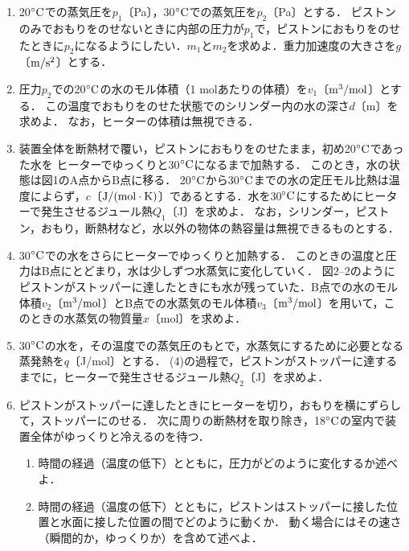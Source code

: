 \begin{enumerate}[(1)]  
  \item 20${}^\circ\mathrm{C}$での蒸気圧を$p_1$〔Pa〕，30${}^\circ\mathrm{C}$での蒸気圧を$p_2$〔Pa〕とする．
  ピストンのみでおもりをのせないときに内部の圧力が$p_1$で，ピストンにおもりをのせたときに$p_2$になるようにしたい．$m_1$と$m_2$を求めよ．重力加速度の大きさを$g$〔$\mathrm{m}/\mathrm{s}^2$〕とする．
\item 圧力$p_2$での20${}^\circ\mathrm{C}$の水のモル体積（1 molあたりの体積）を$v_1$〔$\mathrm{m}^3 / \mathrm{mol}$〕とする．
  この温度でおもりをのせた状態でのシリンダー内の水の深さ$d$〔m〕を求めよ．
  なお，ヒーターの体積は無視できる．
\item 装置全体を断熱材で覆い，ピストンにおもりをのせたまま，初め20${}^\circ\mathrm{C}$であった水を
  ヒーターでゆっくりと30${}^\circ\mathrm{C}$になるまで加熱する．
  このとき，水の状態は図1のA点からB点に移る．
  20${}^\circ\mathrm{C}$から30${}^\circ\mathrm{C}$までの水の定圧モル比熱は温度によらず，$c$〔$\mathrm{J} / (\mathrm{mol}\cdot\mathrm{K})$〕であるとする．水を30${}^\circ\mathrm{C}$にするためにヒーターで発生させるジュール熱$Q_1$〔J〕を求めよ．
  なお，シリンダー，ピストン，おもり，断熱材など，水以外の物体の熱容量は無視できるものとする．
\item 30${}^\circ\mathrm{C}$での水をさらにヒーターでゆっくりと加熱する．
  このときの温度と圧力はB点にとどまり，水は少しずつ水蒸気に変化していく．
  図2--2のようにピストンがストッパーに達したときにも水が残っていた．B点での水のモル体積$v_2$〔$\mathrm{m^3}/\mathrm{mol}$〕とB点での水蒸気のモル体積$v_3$〔$\mathrm{m^3}/\mathrm{mol}$〕を用いて，このときの水蒸気の物質量$x$〔mol〕を求めよ．
\item 30${}^\circ\mathrm{C}$の水を，その温度での蒸気圧のもとで，水蒸気にするために必要となる蒸発熱を$q$〔J/mol〕とする．
  (4)の過程で，ピストンがストッパーに達するまでに，ヒーターで発生させるジュール熱$Q_2$\nolinebreak〔J〕を求めよ．
\item ピストンがストッパーに達したときにヒーターを切り，おもりを横にずらして，ストッパーにのせる．
  次に周りの断熱材を取り除き，18${}^\circ\mathrm{C}$の室内で装置全体がゆっくりと冷えるのを待つ．
  \begin{enumerate}[label=\ctext{\arabic*}]  
    \item 時間の経過（温度の低下）とともに，圧力がどのように変化するか述べよ．
    \item 時間の経過（温度の低下）とともに，ピストンはストッパーに接した位置と水面に接した位置の間でどのように動くか．
      動く場合にはその速さ（瞬間的か，ゆっくりか）を含めて述べよ．
  \end{enumerate}
\end{enumerate}

